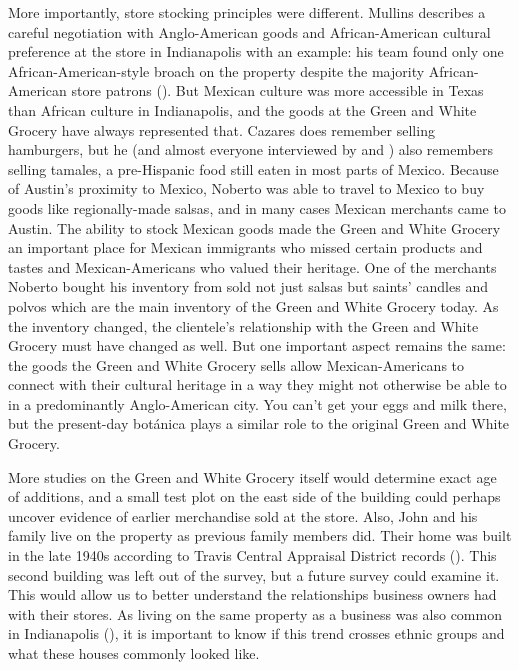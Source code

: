 More importantly, store stocking principles were different. Mullins describes a careful negotiation with Anglo-American goods and African-American cultural preference at the store in Indianapolis with an example: his team found only one African-American-style broach on the property despite the majority African-American store patrons (\cite[92]{mullins}). But Mexican culture was more accessible in Texas than African culture in Indianapolis, and the goods at the Green and White Grocery have always represented that. Cazares does remember selling hamburgers, but he 
(and almost everyone interviewed by \textcite[75-76]{lepe} and \textcite{gandara}) 
also remembers selling tamales, a pre-Hispanic food still eaten in most parts of Mexico. Because of Austin's proximity to Mexico, Noberto was able to travel to Mexico to buy goods like regionally-made salsas, and in many cases Mexican merchants came to Austin. The ability to stock Mexican goods made the Green and White Grocery an important place for Mexican immigrants who missed certain products and tastes and Mexican-Americans who valued their heritage. One of the merchants Noberto bought his inventory from sold not just salsas but saints’ candles and polvos which are the main inventory of the Green and White Grocery today. As the inventory changed, the clientele's relationship with the Green and White Grocery must have changed as well. But one important aspect remains the same: the goods the Green and White Grocery sells allow Mexican-Americans to connect with their cultural heritage in a way they might not otherwise be able to in a predominantly Anglo-American city. You can't get your eggs and milk there, but the present-day botánica plays a similar role to the original Green and White Grocery.


More studies on the Green and White Grocery itself would determine exact age of additions, and a small test plot on the east side of the building could perhaps uncover evidence of earlier merchandise sold at the store. Also, John and his family live on the property as previous family members did. Their home was built in the late 1940s according to Travis Central Appraisal District records (\cite[75-76]{tcad}). This second building was left out of the survey, but a future survey could examine it. This would allow us to better understand the relationships business owners had with their stores. As living on the same property as a business was also common in Indianapolis (\cite{mullins}), it is important to know if this trend crosses ethnic groups and what these houses commonly looked like.

